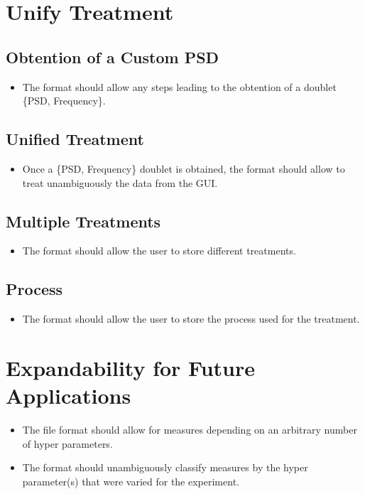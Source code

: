 \documentclass{article}
\begin{document}
\section{Unify Treatment}
\subsection{Obtention of a Custom PSD}
\begin{itemize}
    \item The format should allow any steps leading to the obtention of a doublet \{PSD, Frequency\}.
\end{itemize}

\subsection{Unified Treatment}
\begin{itemize}
    \item Once a \{PSD, Frequency\} doublet is obtained, the format should allow to treat unambiguously the data from the GUI.
\end{itemize}

\subsection{Multiple Treatments}
\begin{itemize}
    \item The format should allow the user to store different treatments.
\end{itemize}

\subsection{Process}
\begin{itemize}
    \item The format should allow the user to store the process used for the treatment.
\end{itemize}

\section{Expandability for Future Applications}
\begin{itemize}
    \item The file format should allow for measures depending on an arbitrary number of hyper parameters.
    \item The format should unambiguously classify measures by the hyper parameter(s) that were varied for the experiment.
\end{itemize}
\end{document}
